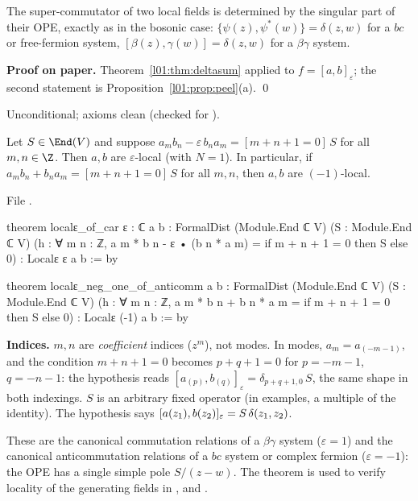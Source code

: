 \begin{physics}
The super-commutator of two local fields is determined by the singular part of their OPE, exactly as in the
bosonic case: $\{\psi(z),\psi^*(w)\} = \delta(z,w)$ for a $bc$ or free-fermion system, $[\beta(z),\gamma(w)] = \delta(z,w)$
for a $\beta\gamma$ system.
\end{physics}

\textbf{Proof on paper.} Theorem~\ref{l01:thm:deltasum} applied to $f = [a,b]_\varepsilon$; the second statement is
Proposition~\ref{l01:prop:peel}(a). \qed

\begin{status}
Unconditional; axioms clean (checked for ).
\end{status}

\begin{theorem}\label{l01:thm:car}
Let $S\in\End(\loneV)$ and suppose $a_mb_n-\varepsilon\,b_na_m = [m+n+1 = 0]\,S$ for all $m,n\in\Z$. Then $a,b$ are
$\varepsilon$-local (with $N = 1$). In particular, if $a_mb_n+b_na_m = [m+n+1 = 0]\,S$ for all $m,n$, then $a,b$ are
$(-1)$-local.
\end{theorem}

\noindent File .
\begin{leancode}
theorem localε_of_car {ε : ℂ} {a b : FormalDist (Module.End ℂ V)} (S : Module.End ℂ V)
    (h : ∀ m n : ℤ, a m * b n - ε • (b n * a m) = if m + n + 1 = 0 then S else 0) :
    Localε ε a b := by

theorem localε_neg_one_of_anticomm {a b : FormalDist (Module.End ℂ V)}
    (S : Module.End ℂ V) (h : ∀ m n : ℤ, a m * b n + b n * a m = if m + n + 1 = 0 then S else 0) :
    Localε (-1) a b := by
\end{leancode}

\begin{dictionary}
\textbf{Indices.} $m,n$ are \emph{coefficient} indices ($z^m$), not modes. In modes, $a_m = a_{(-m-1)}$, and the
condition $m+n+1 = 0$ becomes $p+q+1 = 0$ for $p = -m-1$, $q = -n-1$: the hypothesis reads
$[a_{(p)},b_{(q)}]_\varepsilon = \delta_{p+q+1,0}\,S$, the same shape in both indexings. $S$ is an arbitrary fixed operator
(in examples, a multiple of the identity). The hypothesis says $[a(z_1),b(z_2)]_\varepsilon = S\,\delta(z_1,z_2)$.
\end{dictionary}

\begin{physics}
These are the canonical commutation relations of a $\beta\gamma$ system ($\varepsilon = 1$) and the canonical
anticommutation relations of a $bc$ system or complex fermion ($\varepsilon = -1$): the OPE has a single simple pole
$S/(z-w)$. The theorem is used to verify locality of the generating fields in
,  and
.
\end{physics}

